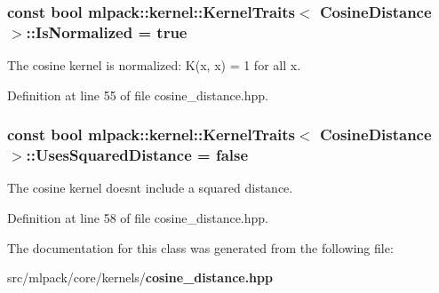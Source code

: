 \subsubsection[{Is\+Normalized}]{\setlength{\rightskip}{0pt plus 5cm}const bool {\bf mlpack\+::kernel\+::\+Kernel\+Traits}$<$ {\bf Cosine\+Distance} $>$\+::Is\+Normalized = true\hspace{0.3cm}{\ttfamily [static]}}\label{classmlpack_1_1kernel_1_1KernelTraits_3_01CosineDistance_01_4_af915c9c00b155743e7b1087802f20854}


The cosine kernel is normalized\+: K(x, x) = 1 for all x. 



Definition at line 55 of file cosine\+\_\+distance.\+hpp.

\subsubsection[{Uses\+Squared\+Distance}]{\setlength{\rightskip}{0pt plus 5cm}const bool {\bf mlpack\+::kernel\+::\+Kernel\+Traits}$<$ {\bf Cosine\+Distance} $>$\+::Uses\+Squared\+Distance = false\hspace{0.3cm}{\ttfamily [static]}}\label{classmlpack_1_1kernel_1_1KernelTraits_3_01CosineDistance_01_4_a16153444efd2321ec2f08a17543f5189}


The cosine kernel doesn\textquotesingle{}t include a squared distance. 



Definition at line 58 of file cosine\+\_\+distance.\+hpp.



The documentation for this class was generated from the following file\+:\begin{DoxyCompactItemize}
\item 
src/mlpack/core/kernels/{\bf cosine\+\_\+distance.\+hpp}\end{DoxyCompactItemize}
